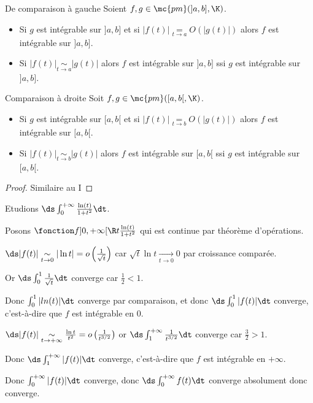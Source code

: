 \begin{theoreme}{De comparaison à gauche}{}
    Soient $f, g \in \mc {pm}(]a, b], \K)$. 
    
    \begin{itemize}
        \item Si $g$ est intégrable sur $]a, b]$ et si $|f(t)| \underset{t \to a   }{= } O(|g(t)|)$
    alors $f$ est intégrable sur $]a, b]$.
        \item Si $|f(t)| \underset{t \to a   }{\sim } |g(t)|$ alors $f$ est intégrable sur $]a, b]$ ssi $g$ est intégrable sur $]a, b]$.
    \end{itemize}
\end{theoreme}

\begin{theoreme}{Comparaison à droite}{}
    Soit $f, g \in \mc{pm}([a, b[, \K)$. 
    
    \begin{itemize}
        \item Si $g$ est intégrable sur $[a, b[$ et si $|f(t)| \underset{t \to b   }{= } O(|g(t)|)$
    alors $f$ est intégrable sur $[a, b[$.
        \item Si $|f(t)| \underset{t \to b   }{\sim } |g(t)|$ alors $f$ est intégrable sur $[a, b[$ ssi $g$ est intégrable sur $[a, b[$.
    \end{itemize}
\end{theoreme}

\begin{proof}
    Similaire au I
\end{proof}

\begin{exemple}
    Etudions $\ds \int_{0}^{+ \infty   } \frac{\ln (t)}{1 + t^2} \dt$. 

    Posons $\fonction f {]0, + \infty[}{\R}{t}{\frac{\ln (t)}{1 + t^2}}$ qui est continue par théorème d'opérations.


    \svspace $\ds |f(t)| \underset{t \to 0   }{\sim } |\ln t| = o \left( \frac 1 {\sqrt t} \right)$
    car $\sqrt t \ln t \xrightarrow[t \to 0 ]{} 0$ par croissance comparée. 

    Or $\ds \int_{0}^{1 } \frac 1 {\sqrt t} \dt$ converge car $\frac 1 2 < 1$. 

    Donc $\int_0^1 |ln(t) | \dt$ converge par comparaison, et donc 
    $\ds \int_{0}^{1 } |f(t)| \dt$ converge, c'est-à-dire que $f$ est intégrable en $0$.


    \svspace $\ds |f(t)| \underset{t \to + \infty   }{\sim } \frac{\ln t}{t^2} = o \left( \frac 1 {t^{3/2}} \right)$
    or $\ds \int_{1 }^{+ \infty   } \frac 1 {t^{3/2}} \dt$ converge car $\frac 3 2 > 1$.

    Donc $\ds \int_{1 }^{+ \infty   } |f(t)| \dt$ converge, c'est-à-dire que $f$ est intégrable en $+ \infty$.

    Donc $\int_0^{+ \infty} | f(t) | \dt$ converge, donc $\ds \int_{0}^{+ \infty   } f(t) \dt$ converge absolument donc converge.
\end{exemple}

